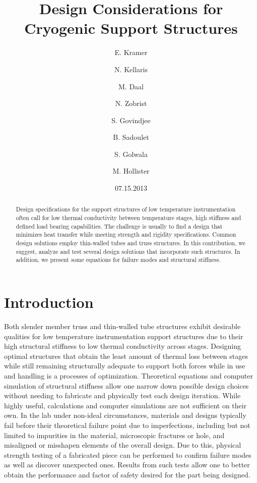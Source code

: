 \documentclass[final]{svjour2}
\begin{document}
\newcommand{\hdblarrow}{H\makebox[0.9ex][l]{$\downdownarrows$}-}
\title{Design Considerations for Cryogenic Support Structures}

\author{E. Kramer \and N. Kellaris  \and M. Daal \and N. Zobrist \and S. Govindjee \and B. Sadoulet \and S. Golwala \and M. Hollister}


\date{07.15.2013}

\maketitle

\begin{abstract}

Design specifications for the support structures of low temperature instrumentation often call for low thermal conductivity between temperature stages, high stiffness and defined load bearing capabilities.  The challenge is usually to find a design that minimizes heat transfer while meeting strength and rigidity specifications.  Common design solutions employ thin-walled tubes and truss structures. In this contribution, we suggest, analyze and test several design solutions that incorporate such structures. In addition, we present some equations for failure modes and structural stiffness.


\end{abstract}

\section{Introduction}
Both slender member truss and thin-walled tube structures exhibit desirable qualities for low temperature instrumentation support structures due to their high structural stiffness to low thermal conductivity across stages.  Designing optimal structures that obtain the least amount of thermal loss between stages while still remaining structurally adequate to support both forces while in use and handling is a processes of optimization.  Theoretical equations and computer simulation of structural stiffness allow one narrow down possible design choices without needing to fabricate and physically test each design iteration.  While highly useful, calculations and computer simulations are not sufficient on their own. In the lab under non-ideal circumstances, materials and designs typically fail before their theoretical failure point due to imperfections, including but not limited to impurities in the material, microscopic fractures or hole, and misaligned or misshapen elements of the overall design.  Due to this, physical strength testing of a fabricated piece can be performed to confirm failure modes as well as discover unexpected ones.  Results from such tests allow one to better obtain the performance and factor of safety desired for the part being designed.
\end{document}
